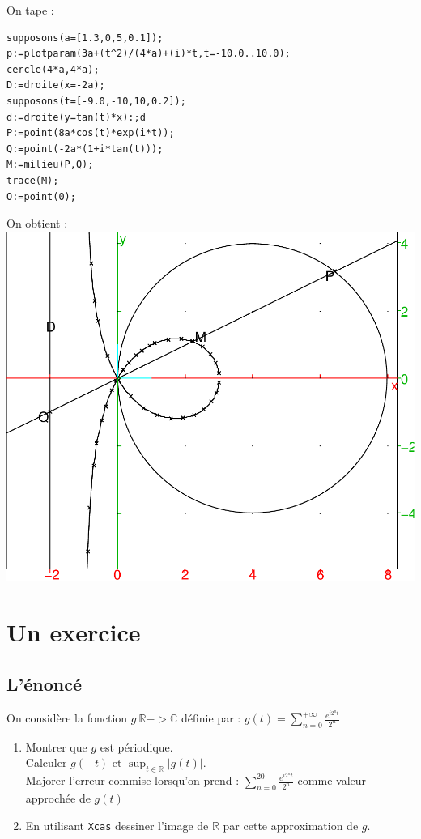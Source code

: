 \documentclass[a4paper,11pt]{book}
\newcommand{\R}{{\mathbb{R}}}
\newcommand{\C}{{\mathbb{C}}}
\begin{document}
On tape :\\
\begin{verbatim}
supposons(a=[1.3,0,5,0.1]);
p:=plotparam(3a+(t^2)/(4*a)+(i)*t,t=-10.0..10.0);
cercle(4*a,4*a);
D:=droite(x=-2a);
supposons(t=[-9.0,-10,10,0.2]);
d:=droite(y=tan(t)*x):;d
P:=point(8a*cos(t)*exp(i*t));
Q:=point(-2a*(1+i*tan(t)));
M:=milieu(P,Q);
trace(M);
O:=point(0);
\end{verbatim} 
On obtient :\\
\includegraphics[width=\textwidth]{trisect4}


\section{Un exercice}
\subsection{L'\'enonc\'e}
On consid\`ere la fonction $g\: \R->\C$ d\'efinie par :
$\displaystyle g(t)=\sum_{n=0}^{+\infty}\frac{e^{i2^nt}}{2^n}$
\begin{enumerate}
\item Montrer que $g$ est p\'eriodique.\\
Calculer $g(-t)$ et $\sup_{t\in \R}|g(t)|$.\\
Majorer l'erreur commise lorsqu'on prend :
$\sum_{n=0}^{20}\frac{e^{i2^nt}}{2^n}$ comme valeur approch\'ee de $g(t)$
\item En utilisant {\tt Xcas} dessiner l'image de $\R$ par cette approximation 
de $g$.
\end{enumerate}
\end{document}
